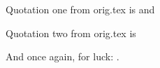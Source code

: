 \documentclass{article}
\begin{document}
Quotation one from orig.tex is
 and 

Quotation two from orig.tex is




And once again, for luck: .
\end{document}
